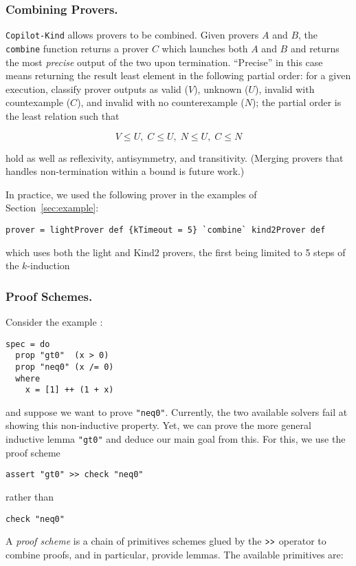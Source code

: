 \subsubsection{Combining Provers.}\label{combining-provers}
\texttt{Copilot-Kind} allows provers to be combined. Given provers $A$ and $B$,
the \texttt{combine} function returns a prover $C$ which launches both $A$ and
$B$ and returns the most \emph{precise} output of the two upon
termination. ``Precise'' in this case means returning the result least element
in the following partial order: for a given execution, classify prover outputs
as valid ($V$), unknown ($U$), invalid with countexample ($C$), and invalid with
no counterexample ($N$); the partial order is the least relation such that

$$V \leq U, \; C \leq U, \; N \leq U, \; C \leq N$$

\noindent
hold as well as reflexivity, antisymmetry, and transitivity. (Merging provers
that handles non-termination within a bound is future work.)

In practice, we used the following prover in the examples of Section~\ref{sec:example}:
\begin{lstlisting}[frame=single]
prover = lightProver def {kTimeout = 5} `combine` kind2Prover def
\end{lstlisting}
which uses both the light and Kind2 provers, the first being limited to 5 steps of the $k$-induction 

\subsubsection{Proof Schemes.}\label{proof-schemes}

Consider the example :
\begin{lstlisting}[frame=single]
spec = do
  prop "gt0"  (x > 0)
  prop "neq0" (x /= 0)
  where
    x = [1] ++ (1 + x)

\end{lstlisting}
and suppose we want to prove \texttt{"neq0"}. Currently, the two available solvers fail at showing this non-inductive property. Yet, we can prove the more general
inductive lemma \texttt{"gt0"} and deduce our main goal from this. For
this, we use the proof scheme

\begin{lstlisting}[frame=single]
assert "gt0" >> check "neq0"
\end{lstlisting}

\noindent
rather than
\begin{lstlisting}[frame=single] 
check "neq0" 
\end{lstlisting}
A \emph{proof scheme} is a chain of
primitives schemes glued by the $\texttt{\textgreater{}\textgreater{}}$
operator to combine proofs, and in particular, provide lemmas. The available primitives are:

